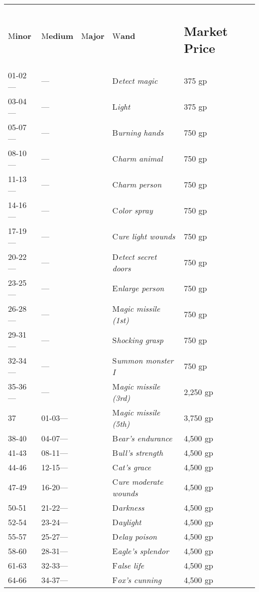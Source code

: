 \documentclass{article}
\begin{document}
\vspace{12pt}
\begin{tabular}{|>{\raggedright}p{26pt}|>{\raggedright}p{30pt}|>{\raggedright}p{23pt}|>{\raggedright}p{159pt}|>{\raggedright}p{51pt}|}
\hline
\multicolumn{5}{|p{290pt}|}{\section*{T\textbf{able: Wands}}}\tabularnewline
\hline
M\textbf{inor} & M\textbf{edium} & M\textbf{ajor} & W\textbf{and} & \subsection*{M\textbf{arket 
Price}}\tabularnewline
\hline
01-02--- & --- &  & D\textit{etect magic} & 375 gp\tabularnewline
\hline
03-04--- & --- &  & L\textit{ight} & 375 gp\tabularnewline
\hline
05-07--- & --- &  & B\textit{urning hands} & 750 gp\tabularnewline
\hline
08-10--- & --- &  & C\textit{harm animal} & 750 gp\tabularnewline
\hline
11-13--- & --- &  & C\textit{harm person} & 750 gp\tabularnewline
\hline
14-16--- & --- &  & C\textit{olor spray} & 750 gp\tabularnewline
\hline
17-19--- & --- &  & C\textit{ure light wounds} & 750 gp\tabularnewline
\hline
20-22--- & --- &  & D\textit{etect secret doors} & 750 gp\tabularnewline
\hline
23-25--- & --- &  & E\textit{nlarge person} & 750 gp\tabularnewline
\hline
26-28--- & --- &  & M\textit{agic missile (1st)} & 750 gp\tabularnewline
\hline
29-31--- & --- &  & S\textit{hocking grasp} & 750 gp\tabularnewline
\hline
32-34--- & --- &  & S\textit{ummon monster I} & 750 gp\tabularnewline
\hline
35-36--- & --- &  & M\textit{agic missile (3rd)} & 2,250 gp\tabularnewline
\hline
37 & 01-03--- &  & M\textit{agic missile (5th)} & 3,750 gp\tabularnewline
\hline
38-40 & 04-07--- &  & B\textit{ear's endurance} & 4,500 gp\tabularnewline
\hline
41-43 & 08-11--- &  & B\textit{ull's strength} & 4,500 gp\tabularnewline
\hline
44-46 & 12-15--- &  & C\textit{at's grace} & 4,500 gp\tabularnewline
\hline
47-49 & 16-20--- &  & C\textit{ure moderate wounds} & 4,500 gp\tabularnewline
\hline
50-51 & 21-22--- &  & D\textit{arkness} & 4,500 gp\tabularnewline
\hline
52-54 & 23-24--- &  & D\textit{aylight} & 4,500 gp\tabularnewline
\hline
55-57 & 25-27--- &  & D\textit{elay poison} & 4,500 gp\tabularnewline
\hline
58-60 & 28-31--- &  & E\textit{agle's splendor} & 4,500 gp\tabularnewline
\hline
61-63 & 32-33--- &  & F\textit{alse life} & 4,500 gp\tabularnewline
\hline
64-66 & 34-37--- &  & F\textit{ox's cunning} & 4,500 gp\tabularnewline
\hline

\end{tabular}
\end{document}
